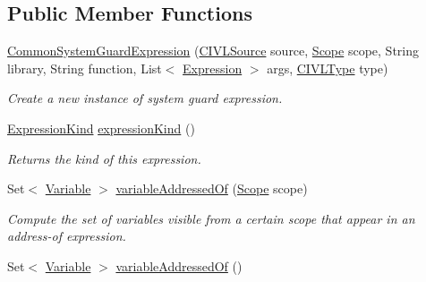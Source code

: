 \subsection*{Public Member Functions}
\begin{DoxyCompactItemize}
\item 
\hyperlink{classedu_1_1udel_1_1cis_1_1vsl_1_1civl_1_1model_1_1common_1_1expression_1_1CommonSystemGuardExpression_a4513fd6125801e577cbc9380c3c28305}{Common\+System\+Guard\+Expression} (\hyperlink{interfaceedu_1_1udel_1_1cis_1_1vsl_1_1civl_1_1model_1_1IF_1_1CIVLSource}{C\+I\+V\+L\+Source} source, \hyperlink{interfaceedu_1_1udel_1_1cis_1_1vsl_1_1civl_1_1model_1_1IF_1_1Scope}{Scope} scope, String library, String function, List$<$ \hyperlink{interfaceedu_1_1udel_1_1cis_1_1vsl_1_1civl_1_1model_1_1IF_1_1expression_1_1Expression}{Expression} $>$ args, \hyperlink{interfaceedu_1_1udel_1_1cis_1_1vsl_1_1civl_1_1model_1_1IF_1_1type_1_1CIVLType}{C\+I\+V\+L\+Type} type)
\begin{DoxyCompactList}\small\item\em Create a new instance of system guard expression. \end{DoxyCompactList}\item 
\hyperlink{enumedu_1_1udel_1_1cis_1_1vsl_1_1civl_1_1model_1_1IF_1_1expression_1_1Expression_1_1ExpressionKind}{Expression\+Kind} \hyperlink{classedu_1_1udel_1_1cis_1_1vsl_1_1civl_1_1model_1_1common_1_1expression_1_1CommonSystemGuardExpression_a28f73a477b739c9a6d373f9054df0069}{expression\+Kind} ()
\begin{DoxyCompactList}\small\item\em Returns the kind of this expression. \end{DoxyCompactList}\item 
Set$<$ \hyperlink{interfaceedu_1_1udel_1_1cis_1_1vsl_1_1civl_1_1model_1_1IF_1_1variable_1_1Variable}{Variable} $>$ \hyperlink{classedu_1_1udel_1_1cis_1_1vsl_1_1civl_1_1model_1_1common_1_1expression_1_1CommonSystemGuardExpression_a675f9f4b7a709abffb16fec82b4c7627}{variable\+Addressed\+Of} (\hyperlink{interfaceedu_1_1udel_1_1cis_1_1vsl_1_1civl_1_1model_1_1IF_1_1Scope}{Scope} scope)
\begin{DoxyCompactList}\small\item\em Compute the set of variables visible from a certain scope that appear in an address-\/of expression. \end{DoxyCompactList}\item 
Set$<$ \hyperlink{interfaceedu_1_1udel_1_1cis_1_1vsl_1_1civl_1_1model_1_1IF_1_1variable_1_1Variable}{Variable} $>$ \hyperlink{classedu_1_1udel_1_1cis_1_1vsl_1_1civl_1_1model_1_1common_1_1expression_1_1CommonSystemGuardExpression_af2d50de98136d6cff1e9a65226288316}{variable\+Addressed\+Of} ()

\end{DoxyCompactItemize}

